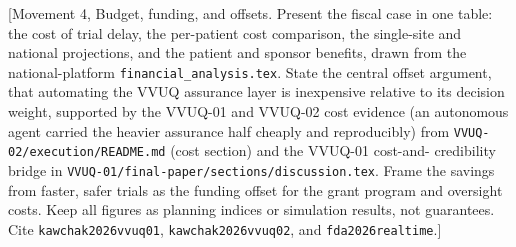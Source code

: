 [Movement 4, Budget, funding, and offsets. Present the fiscal case in one table:
the cost of trial delay, the per-patient cost comparison, the single-site and
national projections, and the patient and sponsor benefits, drawn from the
national-platform \texttt{financial\_analysis.tex}. State the central offset
argument, that automating the VVUQ assurance layer is inexpensive relative to its
decision weight, supported by the VVUQ-01 and VVUQ-02 cost evidence (an autonomous
agent carried the heavier assurance half cheaply and reproducibly) from
\texttt{VVUQ-02/execution/README.md} (cost section) and the VVUQ-01 cost-and-
credibility bridge in \texttt{VVUQ-01/final-paper/sections/discussion.tex}. Frame
the savings from faster, safer trials as the funding offset for the grant program
and oversight costs. Keep all figures as planning indices or simulation results,
not guarantees. Cite \texttt{kawchak2026vvuq01}, \texttt{kawchak2026vvuq02}, and
\texttt{fda2026realtime}.]


